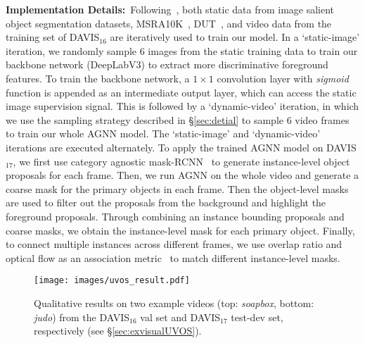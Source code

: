 \documentclass[10pt,twocolumn,letterpaper]{article}
\begin{document}
\noindent\textbf{Implementation Details:}~Following~\cite{DBLP:conf/cvpr/PerazziKBSS17,Song_2018_ECCV}, both static data from image salient object segmentation datasets, {MSRA10K}~\cite{cheng2015global}, {DUT}~\cite{DBLP:conf/cvpr/YangZLRY13}, and video data from the training set of DAVIS$_{16}$  are iteratively used to train our model. In a `static-image' iteration, we randomly sample 6 images from the static training data to train our backbone network (DeepLabV3) to extract more discriminative foreground  features. To train the backbone network,  a $1\!\times\!1$ convolution layer with \textit{sigmoid} function is appended as an intermediate output layer, which can access the static image supervision signal. This is followed by a `dynamic-video' iteration, in which we use the sampling strategy described in \S\ref{sec:detial} to sample 6 video frames to train our whole AGNN model.
The `static-image' and `dynamic-video' iterations are executed alternately. To apply the trained AGNN model on DAVIS$_{17}$, we first use category agnostic mask-RCNN~\cite{he2017mask} to generate instance-level object proposals for each frame. Then, we run AGNN on the whole video and generate a coarse mask for the primary objects in each frame. Then the object-level masks are used to filter out the proposals from the background and highlight the foreground proposals. Through combining an instance bounding proposals and coarse masks, we obtain the instance-level mask for each primary object. Finally, to connect multiple instances across different frames, we use overlap ratio and optical flow as an association metric~\cite{luiten2018premvos} to match different instance-level masks.

\begin{figure*}[t]
	\centering
	\texttt{[image: images/uvos\_result.pdf]}
	\vspace*{-9pt}	
	\caption{\small Qualitative results on two example videos (top: \textit{soapbox}, bottom: \textit{judo}) from the DAVIS$_{16}$ val set and DAVIS$_{17}$ test-dev set, respectively (see \S\ref{sec:exvisualUVOS}). }
	\label{fig:uvos}	
	\vspace*{-18pt}	
\end{figure*}

\vspace*{-12pt}
\end{document}
